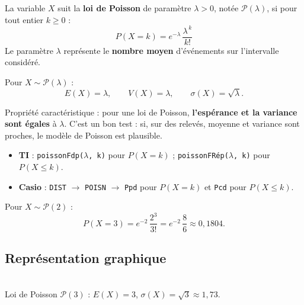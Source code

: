 \documentclass[a4paper,11pt]{article}
\begin{document}
\begin{definition}
La variable $X$ suit la \textbf{loi de Poisson} de paramètre $\lambda > 0$, notée $\mathcal{P}(\lambda)$, si pour tout entier $k \geq 0$ :
\[
\boxed{P(X = k) = e^{-\lambda}\,\frac{\lambda^{\,k}}{k!}}
\]
Le paramètre $\lambda$ représente le \textbf{nombre moyen} d'événements sur l'intervalle considéré.
\end{definition}

\begin{theoreme}
Pour $X \sim \mathcal{P}(\lambda)$ :
\[
E(X) = \lambda, \qquad V(X) = \lambda, \qquad \sigma(X) = \sqrt{\lambda}.
\]
\end{theoreme}

\begin{remarque}
Propriété caractéristique : pour une loi de Poisson, \textbf{l'espérance et la variance sont égales} à $\lambda$. C'est un bon test : si, sur des relevés, moyenne et variance sont proches, le modèle de Poisson est plausible.
\end{remarque}

\begin{calculatrice}
\begin{itemize}
  \item \textbf{TI} : \texttt{poissonFdp($\lambda$, k)} pour $P(X = k)$ ; \; \texttt{poissonFRép($\lambda$, k)} pour $P(X \leq k)$.
  \item \textbf{Casio} : \texttt{DIST} $\rightarrow$ \texttt{POISN} $\rightarrow$ \texttt{Ppd} pour $P(X = k)$ et \texttt{Pcd} pour $P(X \leq k)$.
\end{itemize}
\end{calculatrice}

\begin{exemple}
Pour $X \sim \mathcal{P}(2)$ :
\[
P(X = 3) = e^{-2}\,\frac{2^{3}}{3!} = e^{-2}\,\frac{8}{6} \approx 0{,}1804.
\]
\end{exemple}

\subsection{Représentation graphique}

\begin{center}
\\
{\footnotesize\color{uimmgray} Loi de Poisson $\mathcal{P}(3)$ : $E(X) = 3$, $\sigma(X) = \sqrt{3} \approx 1{,}73$.}
\end{center}
\end{document}
